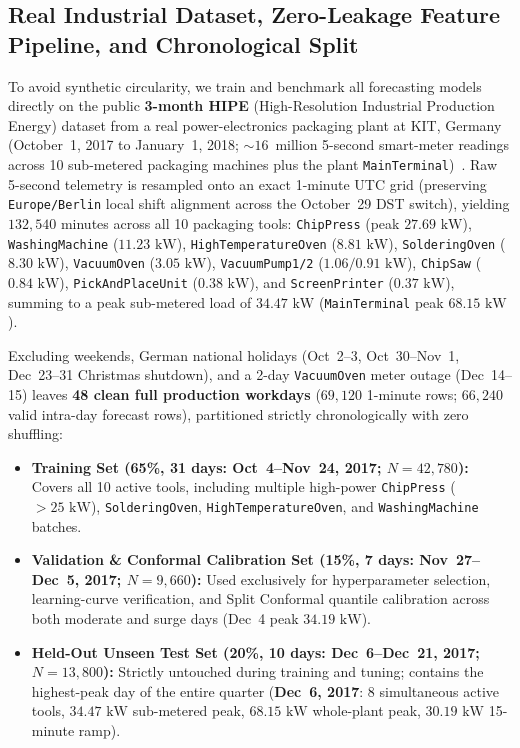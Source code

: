 \subsection{Real Industrial Dataset, Zero-Leakage Feature Pipeline, and Chronological Split}

To avoid synthetic circularity, we train and benchmark all forecasting models directly on the public \textbf{3-month HIPE} (High-Resolution Industrial Production Energy) dataset from a real power-electronics packaging plant at KIT, Germany (October~1, 2017 to January~1, 2018; $\sim 16$~million 5-second smart-meter readings across 10 sub-metered packaging machines plus the plant \texttt{MainTerminal})~\cite{hipe2018}. Raw 5-second telemetry is resampled onto an exact 1-minute UTC grid (preserving \texttt{Europe/Berlin} local shift alignment across the October~29 DST switch), yielding $132{,}540$ minutes across all 10 packaging tools: \texttt{ChipPress} (peak $27.69\text{ kW}$), \texttt{WashingMachine} ($11.23\text{ kW}$), \texttt{HighTemperatureOven} ($8.81\text{ kW}$), \texttt{SolderingOven} ($8.30\text{ kW}$), \texttt{VacuumOven} ($3.05\text{ kW}$), \texttt{VacuumPump1/2} ($1.06/0.91\text{ kW}$), \texttt{ChipSaw} ($0.84\text{ kW}$), \texttt{PickAndPlaceUnit} ($0.38\text{ kW}$), and \texttt{ScreenPrinter} ($0.37\text{ kW}$), summing to a peak sub-metered load of $34.47\text{ kW}$ (\texttt{MainTerminal} peak $68.15\text{ kW}$).

Excluding weekends, German national holidays (Oct~2--3, Oct~30--Nov~1, Dec~23--31 Christmas shutdown), and a 2-day \texttt{VacuumOven} meter outage (Dec~14--15) leaves \textbf{48 clean full production workdays} ($69{,}120$ 1-minute rows; $66{,}240$ valid intra-day forecast rows), partitioned strictly chronologically with zero shuffling:
\begin{itemize}
    \item \textbf{Training Set (65\%, 31 days: Oct~4--Nov~24, 2017; $N = 42{,}780$):} Covers all 10 active tools, including multiple high-power \texttt{ChipPress} ($>25\text{ kW}$), \texttt{SolderingOven}, \texttt{HighTemperatureOven}, and \texttt{WashingMachine} batches.
    \item \textbf{Validation \& Conformal Calibration Set (15\%, 7 days: Nov~27--Dec~5, 2017; $N = 9{,}660$):} Used exclusively for hyperparameter selection, learning-curve verification, and Split Conformal quantile calibration across both moderate and surge days (Dec~4 peak $34.19\text{ kW}$).
    \item \textbf{Held-Out Unseen Test Set (20\%, 10 days: Dec~6--Dec~21, 2017; $N = 13{,}800$):} Strictly untouched during training and tuning; contains the highest-peak day of the entire quarter (\textbf{Dec~6, 2017}: 8 simultaneous active tools, $34.47\text{ kW}$ sub-metered peak, $68.15\text{ kW}$ whole-plant peak, $30.19\text{ kW}$ 15-minute ramp).
\end{itemize}

